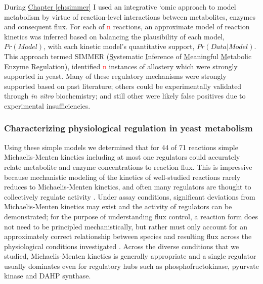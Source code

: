 During \hyperref[ch:simmer]{Chapter \ref{ch:simmer}} I used an integrative `omic approach to model metabolism by virtue of reaction-level interactions between metabolites, enzymes and consequent flux. For each of \textcolor{red}{n} reactions, an approximate model of reaction kinetics was inferred based on balancing the plausibility of each model, $Pr(Model)$, with each kinetic model's quantitative support, $Pr(Data | Model)$. This approach termed SIMMER (\underline{S}ystematic \underline{I}nference of \underline{M}eaningful \underline{M}etabolic \underline{E}nzyme \underline{R}egulation), identified \textcolor{red}{n} instances of allostery which were strongly supported in yeast.  Many of these regulatory mechanisms were strongly supported based on past literature; others could be experimentally validated through \textit{in vitro} biochemistry; and still other were likely false positives due to experimental insufficiencies.

\subsubsection{Characterizing physiological regulation in yeast metabolism}

Using these simple models we determined that for 44 of 71 reactions simple Michaelis-Menten kinetics including at most one regulators could accurately relate metabolite and enzyme concentrations to reaction flux. This is impressive because mechanistic modeling of the kinetics of well-studied reactions rarely reduces to Michaelis-Menten kinetics, and often many regulators are thought to collectively regulate activity \cite{Hill:1977vm}.  Under assay conditions, significant deviations from Michaelis-Menten kinetics may exist and the activity of regulators can be demonstrated; for the purpose of understanding flux control, a reaction form does not need to be principled mechanistically, but rather must only account for an approximately correct relationship between species and resulting flux across the physiological conditions investigated \cite{Fell:1997wg}. Across the diverse conditions that we studied, Michaelis-Menten kinetics is generally appropriate and a single regulator usually dominates even for regulatory hubs such as phosphofructokinase, pyurvate kinase and DAHP synthase.  

